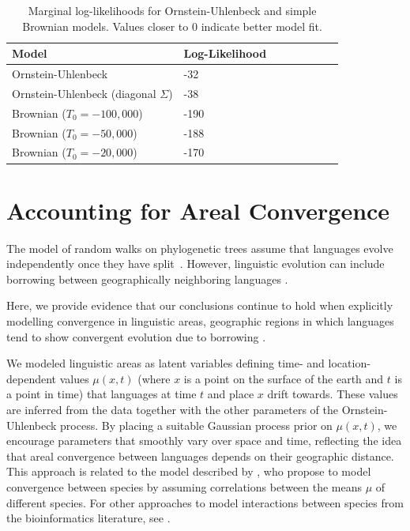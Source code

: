 \documentclass[11pt,a4paper]{article}
\begin{document}
\begin{table}
	\begin{center}
	\begin{tabular}{llllllll}
	Model & Log-Likelihood \\ \hline
	Ornstein-Uhlenbeck & -32 \\
	Ornstein-Uhlenbeck (diagonal $\Sigma$) & -38 \\
	Brownian ($T_0 = -100,000$) & -190 \\
	Brownian ($T_0 = -50,000$) & -188 \\
	Brownian ($T_0 = -20,000$) & -170
\end{tabular}
	\end{center}
	\caption{Marginal log-likelihoods for Ornstein-Uhlenbeck and simple Brownian models. Values closer to $0$ indicate better model fit.}
	\label{tab:marg-brown}
\end{table}

\section{Accounting for Areal Convergence}
The model of random walks on phylogenetic trees assume that languages evolve independently once they have split~\citep[e.g.][]{dunn-evolved-2011, maurits2014tracing}.
However, linguistic evolution can include borrowing between geographically neighboring languages \citep[e.g.][]{dryer1989large, bisang1996areal, heine2003on, aikhenvald2007grammars,  kalyan2019problems}.

Here, we provide evidence that our conclusions continue to hold when explicitly modelling convergence in linguistic areas, geographic regions in which languages tend to show convergent evolution due to borrowing  \citep[e.g.][]{campbell1986meso, nichols1992linguistic, haspelmath2001the, gijn2017linguistic}.

We modeled linguistic areas as latent variables defining time- and location-dependent values $\mu(x,t)$ (where $x$ is a point on the surface of the earth and $t$ is a point in time) that languages at time $t$ and place $x$ drift towards.
These values are inferred from the data together with the other parameters of the Ornstein-Uhlenbeck process.
By placing a suitable Gaussian process prior on $\mu(x,t)$, we encourage parameters that smoothly vary over space and time, reflecting the idea that areal convergence between languages depends on their geographic distance.
This approach is related to the model described by \citep{nuismer2015predicting}, who propose to model convergence between species by assuming correlations between the means $\mu$ of different species.
For other approaches to model interactions between species from the bioinformatics literature, see \citet{manceau2016a,drury2016estimating, bartoszek2017using, drury2018an}.
\end{document}
